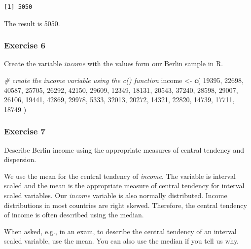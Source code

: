 \documentclass[]{article}
\newenvironment{Shaded}{\begin{snugshade}}{\end{snugshade}}
\newcommand{\KeywordTok}[1]{\textcolor[rgb]{0.13,0.29,0.53}{\textbf{#1}}}
\newcommand{\DecValTok}[1]{\textcolor[rgb]{0.00,0.00,0.81}{#1}}
\newcommand{\StringTok}[1]{\textcolor[rgb]{0.31,0.60,0.02}{#1}}
\newcommand{\CommentTok}[1]{\textcolor[rgb]{0.56,0.35,0.01}{\textit{#1}}}
\newcommand{\NormalTok}[1]{#1}
\theoremstyle{definition}
\theoremstyle{definition}
\theoremstyle{definition}
\theoremstyle{remark}
\begin{document}
\begin{verbatim}
[1] 5050
\end{verbatim}

The result is 5050.

\subsubsection{Exercise 6}\label{exercise-6}

Create the variable \emph{income} with the values form our Berlin sample
in R.

\begin{Shaded}
\begin{Highlighting}[]
\CommentTok{# create the income variable using the c() function}
\NormalTok{income <-}\StringTok{ }\KeywordTok{c}\NormalTok{(}
  \DecValTok{19395}\NormalTok{, }\DecValTok{22698}\NormalTok{, }\DecValTok{40587}\NormalTok{, }\DecValTok{25705}\NormalTok{, }\DecValTok{26292}\NormalTok{, }\DecValTok{42150}\NormalTok{, }\DecValTok{29609}\NormalTok{, }\DecValTok{12349}\NormalTok{, }\DecValTok{18131}\NormalTok{, }
  \DecValTok{20543}\NormalTok{, }\DecValTok{37240}\NormalTok{, }\DecValTok{28598}\NormalTok{, }\DecValTok{29007}\NormalTok{, }\DecValTok{26106}\NormalTok{, }\DecValTok{19441}\NormalTok{, }\DecValTok{42869}\NormalTok{, }\DecValTok{29978}\NormalTok{, }\DecValTok{5333}\NormalTok{, }
  \DecValTok{32013}\NormalTok{, }\DecValTok{20272}\NormalTok{, }\DecValTok{14321}\NormalTok{, }\DecValTok{22820}\NormalTok{, }\DecValTok{14739}\NormalTok{, }\DecValTok{17711}\NormalTok{, }\DecValTok{18749}
\NormalTok{)}
\end{Highlighting}
\end{Shaded}

\subsubsection{Exercise 7}\label{exercise-7}

Describe Berlin income using the appropriate measures of central
tendency and dispersion.

We use the mean for the central tendency of \emph{income}. The variable
is interval scaled and the mean is the appropriate measure of central
tendency for interval scaled variables. Our \emph{income} variable is
also normally distributed. Income distributions in most countries are
right skewed. Therefore, the central tendency of income is often
described using the median.

When asked, e.g., in an exam, to describe the central tendency of an
interval scaled variable, use the mean. You can also use the median if
you tell us why.
\end{document}
